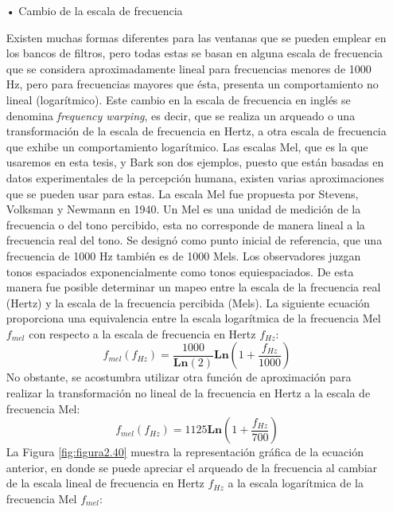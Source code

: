 \begin{enumerate}
\begin{enumerate}
\item[•]Cambio de la escala de frecuencia
\par
Existen muchas formas diferentes para las ventanas que se pueden emplear en los bancos de filtros, pero todas estas se basan en alguna escala de frecuencia que se considera aproximadamente lineal para frecuencias menores de 1000 Hz, pero para frecuencias mayores que ésta, presenta un comportamiento no lineal (logarítmico).
\vskip 0.5cm
Este cambio en la escala de frecuencia en inglés se denomina \textit{frequency warping}, es decir, que se realiza un arqueado o una transformación de la escala de frecuencia en Hertz, a otra escala de frecuencia que exhibe un comportamiento logarítmico. Las escalas Mel, que es la que usaremos en esta tesis, y Bark son dos ejemplos, puesto que están basadas en datos experimentales de la percepción humana, existen varias aproximaciones que se pueden usar para estas.
\vskip 0.5cm
La escala Mel fue propuesta por Stevens, Volksman y Newmann en 1940. Un Mel es una unidad de medición de la frecuencia o del tono percibido, esta no corresponde de manera lineal a la frecuencia real del tono. Se designó como punto inicial de referencia, que una frecuencia de 1000 Hz también es de 1000 Mels. 
\vskip 0.5cm
Los observadores juzgan tonos espaciados exponencialmente como tonos equiespaciados. De esta manera fue posible determinar un mapeo entre la escala de la frecuencia real (Hertz) y la escala de la frecuencia percibida (Mels).
\vskip 0.5cm
La siguiente ecuación proporciona una equivalencia entre la escala logarítmica de la frecuencia Mel $f_{mel}$ con respecto a la escala de frecuencia en Hertz $f_{Hz}$:
\begin{equation}
\label{eq:ecuacion47}
f_{mel}(f_{Hz}) = \frac{1000}{\mathbf{Ln}(2)}\mathbf{Ln}\left ( 1 + \frac{f_{Hz}}{1000} \right )
\end{equation}
No obstante, se acostumbra utilizar otra función de aproximación para realizar la transformación no lineal de la frecuencia en Hertz a la escala de frecuencia Mel:
\begin{equation}
\label{eq:ecuacion48}
f_{mel}(f_{Hz}) = 1125\mathbf{Ln}\left ( 1 + \frac{f_{Hz}}{700} \right )
\end{equation}
La Figura \ref{fig:figura2.40} muestra la representación gráfica de la ecuación anterior, en donde se puede apreciar el arqueado de la frecuencia al cambiar de la escala lineal de frecuencia en Hertz $f_{Hz}$ a la escala logarítmica de la frecuencia Mel $f_{mel}$:
\begin{figure}[H]

\end{figure}
\end{enumerate}
\end{enumerate}
